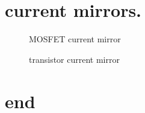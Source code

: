 \documentclass[11ypt]{extarticle}
\begin{document}
\section{current mirrors.}

\begin{figure}[H]{} 
    \centering
	
    \caption{MOSFET current mirror}
\end{figure}

\begin{figure}[H]{} 
    \centering
    
    \caption{transistor current mirror}
\end{figure}

\section{end}

\end{document}
